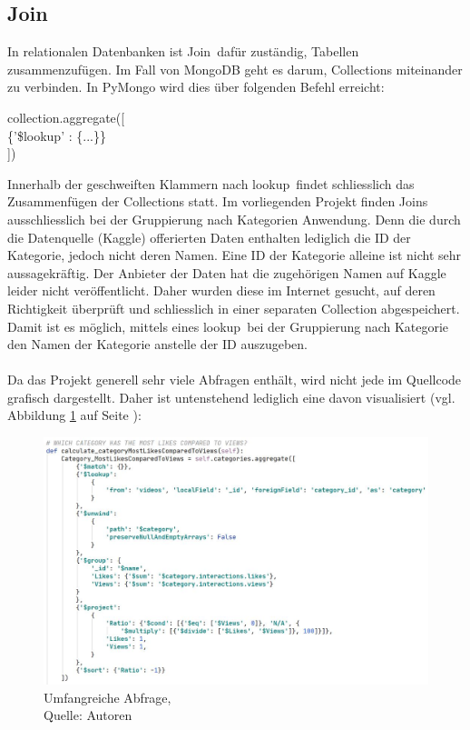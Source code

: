 \documentclass[12pt,titlepage]{article}
\begin{document}
\subsection{Join}
In relationalen Datenbanken ist \glqq Join\grqq\, dafür zuständig, Tabellen zusammenzufügen. Im Fall von MongoDB geht es darum, Collections miteinander zu verbinden. In PyMongo wird dies über folgenden Befehl erreicht:
\begin{center}
collection.aggregate([\\\{'\$lookup' : \{...\}\}\\])
\end{center}
Innerhalb der geschweiften Klammern nach \glqq lookup\grqq\, findet schliesslich das Zusammenfügen der Collections statt. Im vorliegenden Projekt finden \glqq Joins\grqq\, ausschliesslich bei der Gruppierung nach Kategorien Anwendung. Denn die durch die Datenquelle (Kaggle) offerierten Daten enthalten lediglich die ID der Kategorie, jedoch nicht deren Namen. Eine ID der Kategorie alleine ist nicht sehr aussagekräftig. Der Anbieter der Daten hat die zugehörigen Namen auf Kaggle leider nicht veröffentlicht. Daher wurden diese im Internet  gesucht, auf deren Richtigkeit überprüft und schliesslich in einer separaten Collection abgespeichert. Damit ist es möglich, mittels eines \glqq lookup\grqq\, bei der Gruppierung nach Kategorie den Namen der Kategorie anstelle der ID auszugeben.\\
\\
Da das Projekt generell sehr viele Abfragen enthält, wird nicht jede im Quellcode grafisch dargestellt. Daher ist untenstehend lediglich eine davon visualisiert (vgl. Abbildung \ref{fig:Query} auf Seite \pageref{fig:Query}):

\begin{figure}[h]
\centering
\includegraphics[width=15cm]{IMG/Query.PNG}
\caption[Umfangreiche Abfrage]{Umfangreiche Abfrage,\\ Quelle: Autoren} \label{fig:Query}
\end{figure}
\end{document}
